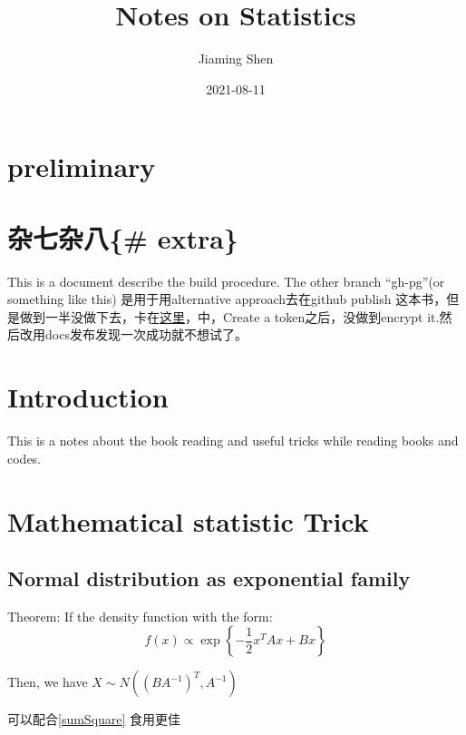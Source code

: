 \documentclass[
]{book}
\title{Notes on Statistics}
\author{Jiaming Shen}
\date{2021-08-11}
\theoremstyle{definition}
\theoremstyle{definition}
\theoremstyle{definition}
\theoremstyle{remark}
\begin{document}
\maketitle

{
\setcounter{tocdepth}{1}
\tableofcontents
}
\hypertarget{preliminary}{%
\chapter*{preliminary}\label{preliminary}}

\hypertarget{ux6742ux4e03ux6742ux516b-extra}{%
\chapter{杂七杂八\{\# extra\}}\label{ux6742ux4e03ux6742ux516b-extra}}

This is a document describe the build procedure.
The other branch ``gh-pg''(or something like this) 是用于用alternative approach去在github publish 这本书，但是做到一半没做下去，卡在\href{https://bookdown.org/yihui/bookdown/github.html}{这里}，中，Create a token之后，没做到encrypt it.然后改用docs发布发现一次成功就不想试了。

\hypertarget{intro}{%
\chapter{Introduction}\label{intro}}

This is a notes about the book reading and useful tricks while reading books and codes.

\hypertarget{mathematical-statistic-trick}{%
\chapter{Mathematical statistic Trick}\label{mathematical-statistic-trick}}

\hypertarget{NormalForm}{%
\section{Normal distribution as exponential family}\label{NormalForm}}

Theorem: If the density function with the form:
\[
f(x) \propto \exp \left\{-\frac{1}{2} x^{T} A x+B x\right\}
\]

Then, we have \(X\sim N\left(\left(B A^{-1}\right)^{T}, A^{-1}\right)\)

可以配合\ref{sumSquare} 食用更佳
\end{document}
